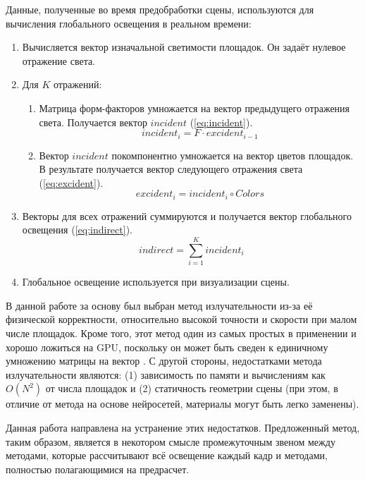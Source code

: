 \documentclass[oneside,final,12pt, a4paper]{extreport}
\begin{document}
	Данные, полученные во время предобработки сцены, используются для вычисления глобального освещения в реальном времени:
\begin{enumerate}
	\item Вычисляется вектор изначальной светимости площадок. Он задаёт нулевое отражение света.
	\item Для $K$ отражений:
	\begin{enumerate}
		\item Матрица форм-факторов умножается на вектор предыдущего отражения света. Получается вектор $incident$ (\ref{eq:incident}).
		\begin{equation}
		incident_i = F \cdot excident_{i - 1}
		\label{eq:incident}
		\end{equation}
		\item Вектор $incident$ покомпонентно умножается на вектор цветов площадок. В результате получается вектор следующего отражения света (\ref{eq:excident}).
		\begin{equation}
		excident_i = incident_i \circ Colors
		\label{eq:excident}
		\end{equation}
	\end{enumerate}
	\item Векторы для всех отражений суммируются и получается вектор глобального освещения (\ref{eq:indirect}).
	\begin{equation}
	indirect = \sum\limits_{i = 1}^K incident_i
	\label{eq:indirect}
	\end{equation}
	\item Глобальное освещение используется при визуализации сцены.
\end{enumerate}

В данной работе за основу был выбран метод излучательности из-за её физической корректности, относительно высокой точности и скорости при малом числе площадок. Кроме того, этот метод один из самых простых в применении и хорошо ложиться на GPU, поскольку он может быть сведен к единичному умножению матрицы на вектор \cite{Radiosity_multibounce}. С другой стороны, недостатками метода излучательности являются: (1) зависимость по памяти и вычислениям как $O(N^2)$ от числа площадок и (2) статичность геометрии сцены (при этом, в отличие от метода на основе нейросетей, материалы могут быть легко заменены).

Данная работа направлена на устранение этих недостатков. Предложенный метод, таким образом, является в некотором смысле промежуточным звеном между методами, которые рассчитывают всё освещение каждый кадр и методами, полностью полагающимися на предрасчет.
\end{document}
